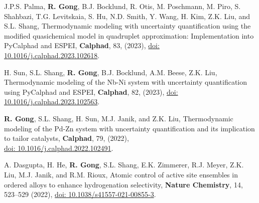 \begin{etaremune}
\item J.P.S. Palma, \textbf{R. Gong}, B.J. Bocklund, R. Otis, M. Poschmann, M. Piro, S. Shahbazi, T.G. Levitskaia, S. Hu,  N.D. Smith, Y. Wang, H. Kim, Z.K. Liu, and S.L. Shang, 
Thermodynamic modeling with uncertainty quantification using the modified quasichemical model in quadruplet approximation: Implementation into PyCalphad and ESPEI,  
\textbf{Calphad}, 83, (2023),
\href{https://doi.org/10.1016/j.calphad.2023.102618}{doi: 10.1016/j.calphad.2023.102618}.

\item H. Sun, S.L. Shang, \textbf{R. Gong}, B.J. Bocklund, A.M. Beese, Z.K. Liu, 
Thermodynamic modeling of the Nb-Ni system with uncertainty quantification using PyCalphad and ESPEI, 
\textbf{Calphad}, 82, (2023),
\href{https://doi.org/10.1016/j.calphad.2023.102563}{doi: 10.1016/j.calphad.2023.102563}.

\item \textbf{R. Gong}, S.L. Shang, H. Sun, M.J. Janik, and Z.K. Liu,
Thermodynamic modeling of the Pd-Zn system with uncertainty quantification and its implication to tailor catalysts, 
\textbf{Calphad}, 79, (2022),\\
\href{https://doi.org/10.1016/j.calphad.2022.102491}{doi: 10.1016/j.calphad.2022.102491}.

\item  A. Dasgupta, H. He, \textbf{R. Gong}, S.L. Shang, E.K. Zimmerer, R.J. Meyer, Z.K. Liu, M.J. Janik, and R.M. Rioux,
Atomic control of active site ensembles in ordered alloys to enhance hydrogenation selectivity, 
\textbf{Nature Chemistry}, 14, 523–529 (2022),
\href{https://doi.org/10.1038/s41557-021-00855-3}{doi: 10.1038/s41557-021-00855-3}.

\end{etaremune}